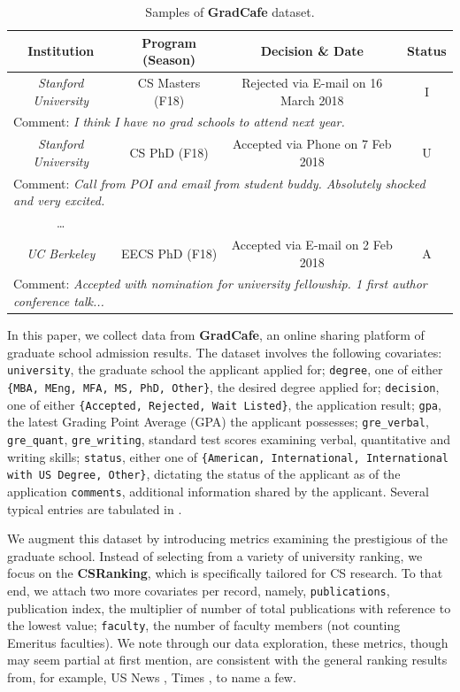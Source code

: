 \documentclass{article}
\newcommand{\noun}[1]{\textbf{#1}}
\newcommand{\var}[1]{\texttt{#1}}
\begin{document}
	\begin{table}[htpb]
	    \centering
	    \begin{tabular}{cccc}
		Institution & Program (Season) & Decision \& Date & Status \\\hline\hline
		\emph{Stanford University} & CS Masters (F18) & Rejected via E-mail on 16 March 2018 & I \\
		\multicolumn{4}{l}{Comment: \emph{I think I have no grad schools to attend next year.}}\\
		\emph{Stanford University} & CS PhD (F18) & Accepted via Phone on 7 Feb 2018 & U \\
		\multicolumn{4}{l}{Comment: \emph{Call from POI and email from student buddy. Absolutely shocked and very excited.}}\\
		\ldots\\
		\emph{UC Berkeley} & EECS PhD (F18) & Accepted via E-mail on 2 Feb 2018 & A \\
		\multicolumn{4}{l}{Comment: \emph{Accepted with nomination for university fellowship. 1 first author conference talk...}}\\ \hline\hline
	    \end{tabular}
	    \caption{Samples of \noun{GradCafe} dataset.}
	    \label{table:data_sample}
	\end{table}
	In this paper, we collect data from \textbf{GradCafe}, an online
	sharing platform of graduate school admission results. The dataset
	involves the following covariates:
	\var{university}, the graduate school the applicant applied for;
	\var{degree}, one of either \var{\{MBA, MEng, MFA, MS, PhD, Other\}}, the desired degree applied for;
	\var{decision}, one of either \var{\{Accepted, Rejected, Wait Listed\}}, the application result;
	\var{gpa}, the latest Grading Point Average (GPA) the applicant possesses;
	\var{gre\_verbal}, \var{gre\_quant}, \var{gre\_writing}, standard test scores examining verbal, quantitative and writing skills;
	\var{status}, either one of \var{\{American, International, International with US Degree,
	Other\}}, dictating the status of the applicant as of the application
	\var{comments}, additional information shared by the applicant. Several
	typical entries are tabulated in .

	We augment this dataset by introducing metrics examining the prestigious of the graduate
	school. Instead of selecting from a variety of university ranking, we focus on the \noun{CSRanking},
	which is specifically tailored for CS research. To that end, we attach two more covariates per record,
	namely,
	\var{publications}, publication index, the multiplier of number of total publications with reference
	to the lowest value;
	\var{faculty}, the number of faculty members (not counting Emeritus faculties).
	We note through our data exploration, these metrics, though may seem partial at first mention,
	are consistent with the general ranking results from, for example, US News \cite{}, Times \cite{},
	to name a few.
\end{document}
